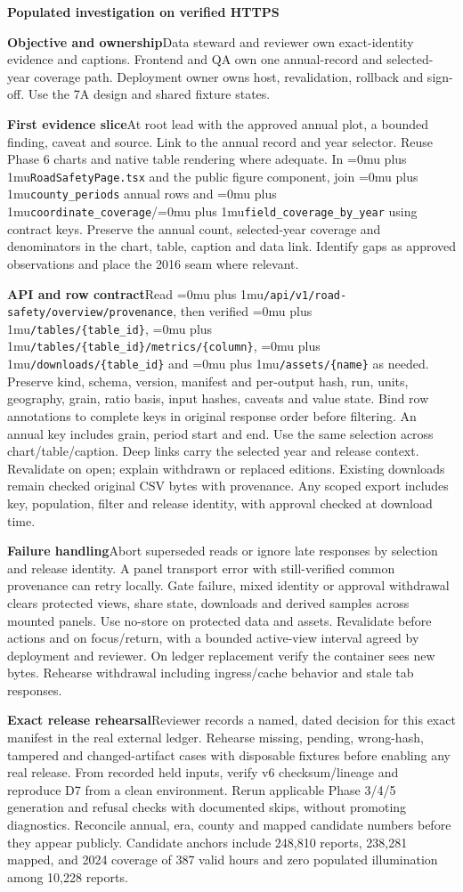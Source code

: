 \documentclass[11pt,a4paper]{article}
\newcommand{\code}[1]{{\Urlmuskip=0mu plus 1mu\relax\nolinkurl{#1}}}
\newcommand{\pagehead}[2]{\clearpage\phantomsection\pdfbookmark[0]{#2}{page.\thepage}{\sffamily\small\color{teal}\MakeUppercase{#1}}\par{\LARGE\raggedright\bfseries #2}\par\vspace{3pt}}
\newcommand{\lead}[2]{\textbf{#1}\enspace #2\par}
\begin{document}
\pagehead{Phase 7B}{Populated investigation on verified HTTPS}
\lead{Objective and ownership}{Data steward and reviewer own exact-identity evidence and captions. Frontend and QA own one annual-record and selected-year coverage path. Deployment owner owns host, revalidation, rollback and sign-off. Use the 7A design and shared fixture states.}
\lead{First evidence slice}{At root lead with the approved annual plot, a bounded finding, caveat and source. Link to the annual record and year selector. Reuse Phase 6 charts and native table rendering where adequate. In \code{RoadSafetyPage.tsx} and the public figure component, join \code{county_periods} annual rows and \code{coordinate_coverage}/\code{field_coverage_by_year} using contract keys. Preserve the annual count, selected-year coverage and denominators in the chart, table, caption and data link. Identify gaps as approved observations and place the 2016 seam where relevant.}
\lead{API and row contract}{Read \code{/api/v1/road-safety/overview/provenance}, then verified \code{/tables/{table_id}}, \code{/tables/{table_id}/metrics/{column}}, \code{/downloads/{table_id}} and \code{/assets/{name}} as needed. Preserve kind, schema, version, manifest and per-output hash, run, units, geography, grain, ratio basis, input hashes, caveats and value state. Bind row annotations to complete keys in original response order before filtering. An annual key includes grain, period start and end. Use the same selection across chart/table/caption. Deep links carry the selected year and release context. Revalidate on open; explain withdrawn or replaced editions. Existing downloads remain checked original CSV bytes with provenance. Any scoped export includes key, population, filter and release identity, with approval checked at download time.}
\lead{Failure handling}{Abort superseded reads or ignore late responses by selection and release identity. A panel transport error with still-verified common provenance can retry locally. Gate failure, mixed identity or approval withdrawal clears protected views, share state, downloads and derived samples across mounted panels. Use no-store on protected data and assets. Revalidate before actions and on focus/return, with a bounded active-view interval agreed by deployment and reviewer. On ledger replacement verify the container sees new bytes. Rehearse withdrawal including ingress/cache behavior and stale tab responses.}
\lead{Exact release rehearsal}{Reviewer records a named, dated decision for this exact manifest in the real external ledger. Rehearse missing, pending, wrong-hash, tampered and changed-artifact cases with disposable fixtures before enabling any real release. From recorded held inputs, verify v6 checksum/lineage and reproduce D7 from a clean environment. Rerun applicable Phase 3/4/5 generation and refusal checks with documented skips, without promoting diagnostics. Reconcile annual, era, county and mapped candidate numbers before they appear publicly. Candidate anchors include 248,810 reports, 238,281 mapped, and 2024 coverage of 387 valid hours and zero populated illumination among 10,228 reports.}
\end{document}
